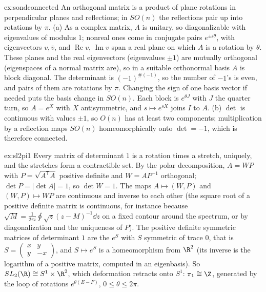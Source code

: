 \begin{solution}{ex:sondconnected}
\idea An orthogonal matrix is a product of plane rotations in perpendicular planes and reflections; in $SO(n)$ the reflections pair up into rotations by $\pi$.
\writeup (a) As a complex matrix, $A$ is unitary, so diagonalizable with eigenvalues of modulus $1$; nonreal ones come in conjugate pairs $e^{\pm i\theta}$, with eigenvectors $v,\bar v$, and $\operatorname{Re}v$, $\operatorname{Im}v$ span a real
plane on which $A$ is a rotation by $\theta$. These planes and the real eigenvectors (eigenvalues $\pm1$) are mutually orthogonal (eigenspaces of a normal matrix are), so in a suitable orthonormal basis $A$ is block
diagonal. The determinant is $(-1)^{\#(-1)}$, so the number of $-1$'s is even, and pairs of them are rotations by $\pi$. Changing the sign of one basis vector if needed puts the basis change in $SO(n)$. Each block
is $e^{\theta J}$ with $J$ the quarter turn, so $A=e^X$ with $X$ antisymmetric, and $s\mapsto e^{sX}$ joins $I$ to $A$. (b) $\det$ is continuous with values $\pm1$, so $O(n)$ has at least two components; multiplication by a
reflection maps $SO(n)$ homeomorphically onto $\det=-1$, which is therefore connected.
\end{solution}

\begin{solution}{ex:sl2pi1}
\idea Every matrix of determinant $1$ is a rotation times a stretch, uniquely, and the stretches form a contractible set.
\writeup By the polar decomposition, $A=WP$ with $P=\sqrt{A^{\mathsf T}A}$ positive definite and $W=AP^{-1}$ orthogonal; $\det P=|\det A|=1$, so $\det W=1$. The maps $A\mapsto(W,P)$ and $(W,P)\mapsto WP$ are continuous and
inverse to each other (the square root of a positive definite matrix is continuous, for instance because $\sqrt{M}=\frac1{2\pi i}\oint\sqrt z(z-M)^{-1}\dd z$ on a fixed contour around the spectrum, or by
diagonalization and the uniqueness of $P$). The positive definite symmetric matrices of determinant $1$ are the $e^S$ with $S$ symmetric of trace $0$, that is $S=\begin{pmatrix}x&y\\y&-x\end{pmatrix}$, and $S\mapsto e^S$ is a
homeomorphism from $\R^2$ (its inverse is the logarithm of a positive matrix, computed in an eigenbasis). So $SL_2(\R)\cong S^1\times\R^2$, which deformation retracts onto $S^1$: $\pi_1\cong\Z$, generated by the loop of
rotations $e^{\theta(E-F)}$, $0\le\theta\le2\pi$.
\end{solution}

